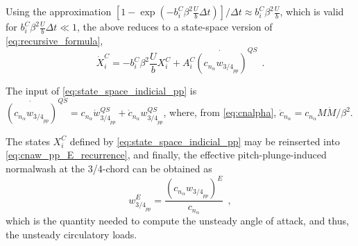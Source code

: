 \documentclass[12pt,a4paper,oneside,english]{abntex2} %
\newcommand{\fix}[1]{{\color{red}#1}}
\def\lb{\left[}
\def\rb{\right]}
\def\lp{\left(}
\def\rp{\right)}
\def\dt{\Delta t}
\def\dt{\Delta t}
\begin{document}
Using the approximation $\lb1-\exp{\lp{-b_i^C\beta^2\frac{U}{b}\dt}\rp}\rb/\dt \approx b_i^C\beta^2\frac{U}{b}$, which is valid for $b_i^C\beta^2\frac{U}{b}\dt \ll 1$, the above \fix{reduces} to a state-space version of \cref{eq:recursive_formula},
\begin{equation}
    \dot{X}_i^C = -b_i^C\beta^2\frac{U}{b}X_i^C + A_i^C\dot{\lp c_{n_{\alpha}}w_{{3/4}_{pp}}\rp}^{QS} \ \ .
    \label{eq:state_space_indicial_pp}
\end{equation}

\fix{The input of \cref{eq:state_space_indicial_pp} is $\dot{\lp c_{n_{\alpha}}w_{{3/4}_{pp}}\rp}^{QS}=c_{n_{\alpha}}\dot{w}_{{3/4}_{pp}}^{QS}+\dot{c}_{n_{\alpha}}w_{{3/4}_{pp}}^{QS}$, where, from \cref{eq:cnalpha}, $\dot{c}_{n_{\alpha}}=c_{n_{\alpha}}M\dot{M}/\beta^2$.}

The states $X_i^C$ defined by \cref{eq:state_space_indicial_pp} may be reinserted into \cref{eq:cnaw_pp_E_recurrence}, and finally, the effective pitch-plunge-induced normalwash at the 3/4-chord can be obtained as
\begin{equation}
    w_{{3/4}_{pp}}^{E} = \frac{\lp c_{n_{\alpha}}w_{{3/4}_{pp}}\rp^{E}}{c_{n_{\alpha}}} \ \ ,
    \label{eq:w_34pp_E} 
\end{equation}
which is the quantity needed to compute the unsteady angle of attack, and thus, the unsteady circulatory loads.
\end{document}
